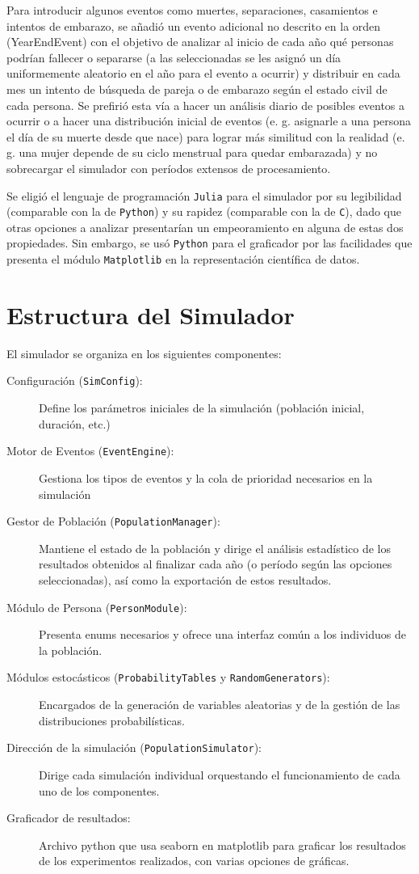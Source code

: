 \documentclass[12pt, a4paper, spanish]{report}
\begin{document}
Para introducir algunos eventos como muertes, separaciones, casamientos e intentos de embarazo, se añadió un evento adicional no descrito en la orden (YearEndEvent) con el objetivo de analizar al inicio de cada año qué personas podrían fallecer o separarse (a las seleccionadas se les asignó un día uniformemente aleatorio en el año para el evento a ocurrir) y distribuir en cada mes un intento de búsqueda de pareja o de embarazo según el estado civil de cada persona. Se prefirió esta vía a hacer un análisis diario de posibles eventos a ocurrir o a hacer una distribución inicial de eventos (e. g. asignarle a una persona el día de su muerte desde que nace) para lograr más similitud con la realidad (e. g. una mujer depende de su ciclo menstrual para quedar embarazada) y no sobrecargar el simulador con períodos extensos de procesamiento.

Se eligió el lenguaje de programación \texttt{Julia} para el simulador por su legibilidad (comparable con la de \texttt{Python}) y su rapidez (comparable con la de \texttt{C}), dado que otras opciones a analizar presentarían un empeoramiento en alguna de estas dos propiedades. Sin embargo, se usó \texttt{Python} para el graficador por las facilidades que presenta el módulo \texttt{Matplotlib} en la representación científica de datos.

\section{Estructura del Simulador}

El simulador se organiza en los siguientes componentes:

\begin{description}
    \item[Configuración (\texttt{SimConfig}):] Define los parámetros iniciales de la simulación (población inicial, duración, etc.)
    \item[Motor de Eventos (\texttt{EventEngine}):] Gestiona los tipos de eventos y la cola de prioridad necesarios en la simulación
    \item[Gestor de Población (\texttt{PopulationManager}):] Mantiene el estado de la población y dirige el análisis estadístico de los resultados obtenidos al finalizar cada año (o período según las opciones seleccionadas), así como la exportación de estos resultados.
    \item[Módulo de Persona (\texttt{PersonModule}):] Presenta enums necesarios y ofrece una interfaz común a los individuos de la población.
    \item[Módulos estocásticos (\texttt{ProbabilityTables} y \texttt{RandomGenerators}):] Encargados de la generación de variables aleatorias y de la gestión de las distribuciones probabilísticas.
    \item[Dirección de la simulación (\texttt{PopulationSimulator}):] Dirige cada simulación individual orquestando el funcionamiento de cada uno de los componentes.
    \item[Graficador de resultados:] Archivo python que usa seaborn en matplotlib para graficar los resultados de los experimentos realizados, con varias opciones de gráficas.
\end{description}
\end{document}
